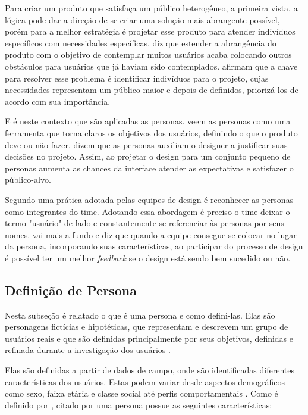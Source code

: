 Para criar um produto que satisfaça um público heterogêneo, a primeira vista, a lógica pode dar a direção de se criar uma solução mais abrangente possível, porém para  a melhor estratégia é projetar esse produto para atender indivíduos específicos com necessidades específicas.  diz que estender a abrangência do produto com o objetivo de contemplar muitos usuários acaba colocando outros obstáculos para usuários que já haviam sido contemplados.  afirmam que a chave para resolver esse problema é identificar indivíduos para o projeto, cujas necessidades representam um público maior e depois de definidos, priorizá-los de acordo com sua importância. 

E é neste contexto que são aplicadas as personas.  veem as personas como uma ferramenta que torna claros os objetivos dos usuários, definindo o que o produto deve ou não fazer.  dizem que as personas auxiliam o designer a justificar suas decisões no projeto. Assim, ao projetar o design para um conjunto pequeno de personas aumenta as chances da interface atender as expectativas e satisfazer o público-alvo. %

Segundo  uma prática adotada pelas equipes de design é reconhecer as personas como integrantes do time. Adotando essa abordagem é preciso o time deixar o termo "usuário" de lado e constantemente se referenciar às personas por seus nomes.  vai mais a fundo e diz que quando a equipe consegue se colocar no lugar da persona, incorporando suas características, ao participar do processo de design é possível ter um melhor \textit{feedback} se o design está sendo bem sucedido ou não. 

\subsection{Definição de Persona}

Nesta subseção é relatado o que é uma persona e como defini-las. Elas são personagens fictícias e hipotéticas, que representam e descrevem um grupo de usuários reais e que são definidas principalmente por seus objetivos, definidas e refinada durante a investigação dos usuários \cite[p. 176]{barbosa_silva, cooper07, pruitt, cooper99}. %

Elas são definidas a partir de dados de campo, onde são identificadas diferentes características dos usuários. Estas podem variar desde aspectos demográficos como sexo, faixa etária e classe social até perfis comportamentais \cite[p. 81]{Vianna_2014}. Como é definido por , citado por \cite[p. 177]{barbosa_silva} uma persona possue as seguintes características: %

